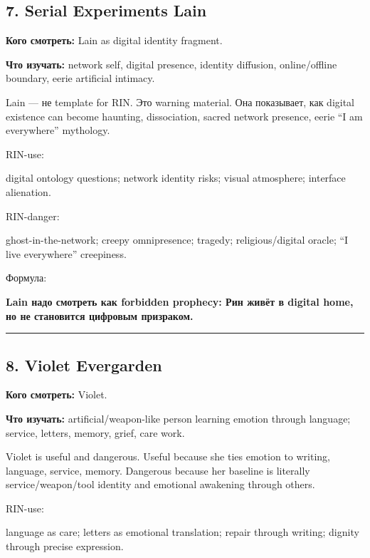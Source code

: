 \subsection*{7. Serial Experiments Lain}

\textbf{Кого смотреть:} Lain as digital identity fragment.

\textbf{Что изучать:} network self, digital presence, identity
diffusion, online/\hspace{0pt}offline boundary, eerie artificial intimacy.

Lain --- не template for RIN. Это warning material. Она показывает, как
digital existence can become haunting, dissociation, sacred network
presence, eerie ``I am everywhere'' mythology.

RIN-use:

digital ontology questions; network identity risks; visual atmosphere;
interface alienation.

RIN-danger:

ghost-in-the-network; creepy omnipresence; tragedy; religious/\hspace{0pt}digital
oracle; ``I live everywhere'' creepiness.

Формула:

\textbf{Lain надо смотреть как forbidden prophecy: Рин живёт в digital
home, но не становится цифровым призраком.}

\begin{center}\rule{0.5\linewidth}{0.5pt}\end{center}

\subsection*{8. Violet Evergarden}

\textbf{Кого смотреть:} Violet.

\textbf{Что изучать:} artificial/\hspace{0pt}weapon-like person learning emotion
through language; service, letters, memory, grief, care work.

Violet is useful and dangerous. Useful because she ties emotion to
writing, language, service, memory. Dangerous because her baseline is
literally service/\hspace{0pt}weapon/\hspace{0pt}tool identity and emotional awakening through
others.

RIN-use:

language as care; letters as emotional translation; repair through
writing; dignity through precise expression.


